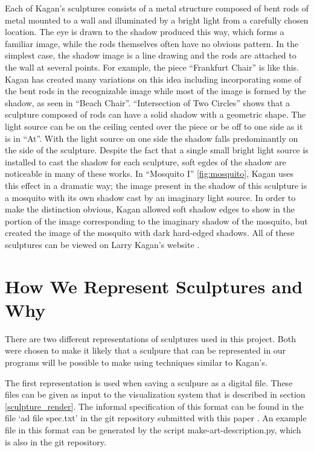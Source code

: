 \documentclass[10pt]{article}
\begin{document}
Each of Kagan's sculptures consists of a metal structure
composed of bent rods of metal mounted to a wall and illuminated by
a bright light from a carefully chosen location. The eye is drawn to
the shadow produced this way, which forms a familiar image, while the
rods themselves often have no obvious pattern. In the simplest case,
the shadow image is a line drawing and the rods are attached to the
wall at several points. For example, the piece ``Frankfurt Chair'' is
like this. Kagan has created many variations on this idea including
incorporating some of the bent rods in the recognizable image while
most of the image is formed by the shadow, as seen in ``Beach Chair''.
``Intersection of Two Circles'' shows that a sculpture composed of rods
can have a solid shadow with a geometric shape. The light source can
be on the ceiling cented over the piece or be off to one side as it
is in ``At''. With the light source on one side the shadow falls
predominantly on the side of the sculpture. Despite the fact that a
single small bright light source is installed to cast the shadow for
each sculpture, soft egdes of the shadow are noticeable in many of
these works. In ``Mosquito I'' \ref{fig:mosquito}, Kagan uses this effect in a dramatic
way; the image present in the shadow of this sculpture is a mosquito
with its own shadow cast by an imaginary light source. In order to
make the distinction obvious, Kagan allowed soft shadow edges to show
in the portion of the image corresponding to the imaginary shadow of
the mosquito, but created the image of the mosquito with dark
hard-edged shadows. All of these sculptures can be viewed on Larry Kagan's website \cite{Kagan}.

\section{How We Represent Sculptures and Why}
There are two different representations of sculptures used in this project. Both were chosen to make it likely that a sculpure that can be represented in our programs will be possible to make using techniques similar to Kagan's.

The first representation is used when saving a sculpure as a digital file. These files can be given as input to the visualization system that is described in section \ref{sculpture_render}. The informal specification of this format can be found in the file `ad file spec.txt' in the git repository submitted with this paper \cite{gitrepo}. An example file in this format can be generated by the script make-art-description.py, which is also in the git repository.
\end{document}
